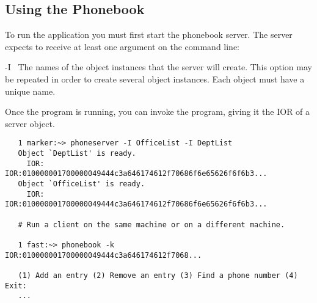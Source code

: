 

\subsection{Using the Phonebook}
\label{subsec:CORBAXX:Using the Phonebook}

To run the application you must first start the phonebook server.  The server
expects to receive at least one argument on the command line:

\begin{optionlist}
  \item[-I~\optionarg{name}]
  The names of the object instances that the server will create.  This option
  may be repeated in order to create several object instances.  Each object
  must have a unique name.
\end{optionlist}

Once the  program is running, you can invoke the
 program, giving it the IOR of a server object.

\begin{verbatim}
   1 marker:~> phoneserver -I OfficeList -I DeptList
   Object `DeptList' is ready.
     IOR:  IOR:010000001700000049444c3a646174612f70686f6e65626f6f6b3...
   Object `OfficeList' is ready.
     IOR:  IOR:010000001700000049444c3a646174612f70686f6e65626f6f6b3...

   # Run a client on the same machine or on a different machine.

   1 fast:~> phonebook -k IOR:010000001700000049444c3a646174612f7068...

   (1) Add an entry (2) Remove an entry (3) Find a phone number (4) Exit:
   ...
\end{verbatim}




